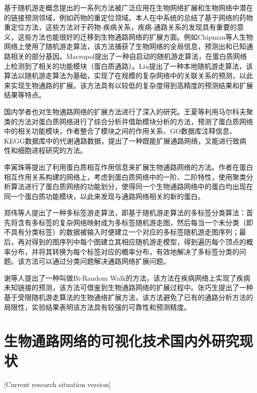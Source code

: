 基于随机游走概念提出的一系列方法被广泛应用在生物网络扩展和生物网络中潜在的链接预测领域，例如药物的重定位领域。本人在\cite{xue2018review}中系统的总结了基于网络的药物重定位方法，这些方法对于药物-疾病关系，疾病-通路关系的发现具有重要的意义，这些方法也能很好的迁移到生物通路网络的扩展方面。例如Chipman\cite{chipman2009predicting}等人生物网络上使用了随机游走算法，该方法捕获了生物网络的全局信息，预测出和已知通路相关的部分基因。Macropol\cite{macropol2009rrw}提出了一种自启动的随机游走算法，在蛋白质网络上检测到了相关的功能模块（蛋白质通路）。Liu\cite{liu2010link}提出了一种本地随机游走算法，该算法以随机游走算法为基础，实现了在规模的复杂网络中的关联关系的预测，以此来实现生物通路的扩展。该方法具有以较低的复杂度得到高精度的预测结果和扩展结果等特点。


国内学者也对生物通路网络的扩展方法进行了深入的研究。王夏\cite{wang2009}等利用马尔科夫聚类的方法对蛋白质网络进行了综合分析并借助模块分析的方法，预测了蛋白质网络中的相关功能模块，作者整合了模块之间的作用关系、GO数据库注释信息、KEGG\cite{kanehisa2008kegg}数据库中的代谢通路数据，提出了一种既能扩展通路网络，又能进行致病性和细胞进程研究的方法。


李寅珠\cite{liyinzhu2012}等提出了利用蛋白质相互作用信息来扩展生物通路网络的方法。作者在蛋白相互作用关系构建的网络上，考虑到蛋白质网络中的一阶、二阶特性，使用聚类分析算法进行了蛋白质网络的功能划分，使得同一个生物通路网络中的蛋白均出现在同一个蛋白质功能模块，以此来发现与通路网络相关的新的蛋白。

郑伟\cite{zhengwei2010}等人提出了一种多标签游走算法，即基于随机游走算法的多标签分类算法：首先将含有多标签的复杂网络映射成为多标签随机游走图，然后每当一个未分类（即不具有分类标签）的数据被输入时便建立一个对应的多标签随机游走图序列；最后，再对得到的图序列中每个图建立其相应随机游走模型，得到遍历每个顶点的概率分布，并将其转换为每个标签对应的概率分布，有效地解决了多标签分类的问题。该方法可以通过分类问题解决通路网络扩展问题。

谢\cite{xie2012prioritizing}等人提出了一种叫做Bi-Random Walk的方法，该方法在疾病网络上实现了疾病未知链接的预测，该方法可借鉴到生物通路网络的扩展过程中。张巧生\cite{zhang2016network}提出了一种基于受限随机游走算法的生物通络扩展方法，该方法避免了已有的通路分析方法的局限性，实验结果表明该方法具有较强的可靠性和预测精度。

\section{生物通路网络的可视化技术国内外研究现状}[Current research situation version]

